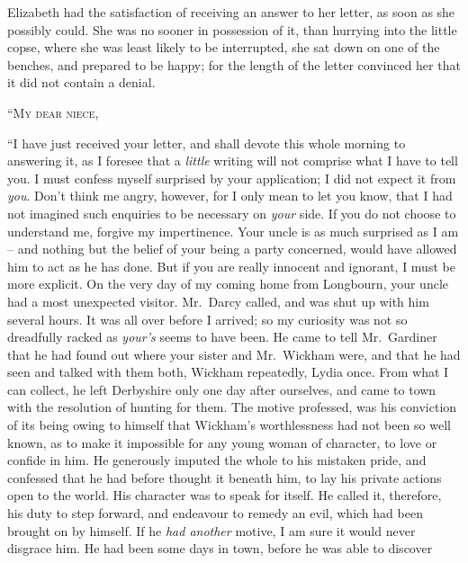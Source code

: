 
Elizabeth had the satisfaction of receiving an answer
to her letter, as soon as she possibly could. She was no
sooner in possession of it, than hurrying into the little
copse, where she was least likely to be interrupted, she
sat down on one of the benches, and prepared to be happy;
for the length of the letter convinced her that it did not
contain a denial.

\begin{letter}

“\textsc{My dear niece},

“I have just received your letter, and shall devote this
whole morning to answering it, as I foresee that a \textit{little}
writing will not comprise what I have to tell you. I must
confess myself surprised by your application; I did not
expect it from \textit{you}. Don’t think me angry, however, for I
only mean to let you know, that I had not imagined such
enquiries to be necessary on \textit{your} side. If you do not
choose to understand me, forgive my impertinence. Your
uncle is as much surprised as I am -- and nothing but the
belief of your being a party concerned, would have allowed
him to act as he has done. But if you are really innocent
and ignorant, I must be more explicit. On the very day
of my coming home from Longbourn, your uncle had a
most unexpected visitor. Mr.\ Darcy called, and was shut
up with him several hours. It was all over before I arrived;
so my curiosity was not so dreadfully racked as \textit{your’s}
seems to have been. He came to tell Mr.\ Gardiner that
he had found out where your sister and Mr.\ Wickham were,
and that he had seen and talked with them both, Wickham
repeatedly, Lydia once. From what I can collect, he left
Derbyshire only one day after ourselves, and came to
town with the resolution of hunting for them. The motive
professed, was his conviction of its being owing to himself
that Wickham’s worthlessness had not been so well known,
as to make it impossible for any young woman of character,
to love or confide in him. He generously imputed the
whole to his mistaken pride, and confessed that he
had before thought it beneath him, to lay his private
actions open to the world. His character was to speak
for itself. He called it, therefore, his duty to step
forward, and endeavour to remedy an evil, which had
been brought on by himself. If he \textit{had another} motive,
I am sure it would never disgrace him. He had
been some days in town, before he was able to discover

\end{letter}
